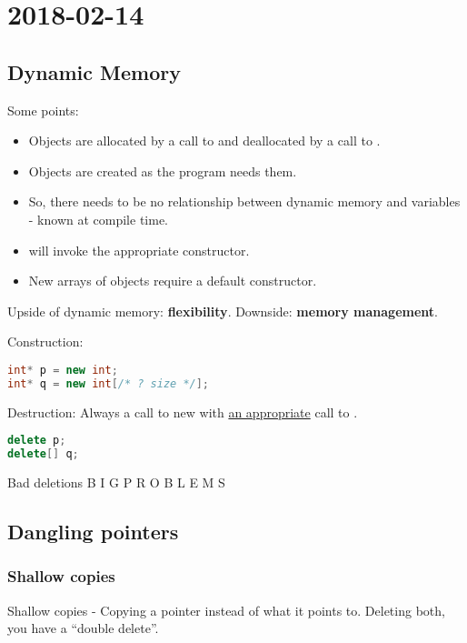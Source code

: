 \section{2018-02-14}

\subsection{Dynamic Memory}

Some points:

\begin{itemize}
  \item Objects are allocated by a call to  and deallocated by a call to .
  \item Objects are created as the program needs them.
  \item So, there needs to be no relationship between dynamic memory and variables - known at compile time.
  \item {} will invoke the appropriate constructor.
  \item New arrays of objects require a default constructor.
\end{itemize}

Upside of dynamic memory: \textbf{flexibility}. Downside: \textbf{memory management}.

Construction:

\begin{lstlisting}[language=C++]
int* p = new int;
int* q = new int[/* ? size */];
\end{lstlisting}

Destruction: Always a call to new with \underline{an appropriate} call to .

\begin{lstlisting}[language=C++]
delete p;
delete[] q;
\end{lstlisting}

Bad deletions \textrightarrow B I G   P R O B L E M S

\subsection{Dangling pointers}

\subsubsection{Shallow copies}

Shallow copies - Copying a pointer instead of what it points to. Deleting both, you have a ``double delete''.

